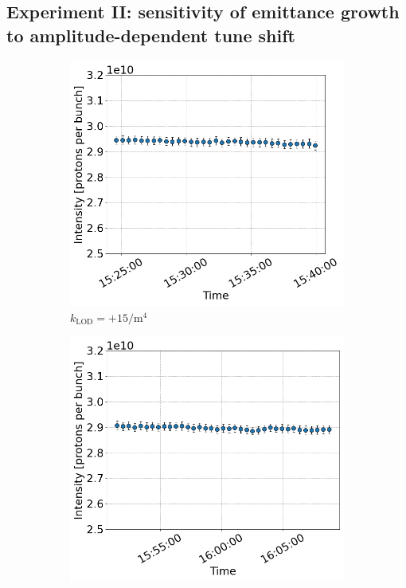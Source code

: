 \newpage
 \subsection{Experiment II: sensitivity of emittance growth to amplitude-dependent tune shift}\label{subsec:2022_exp2_intensity}


\begin{figure}[htp]
     \centering
     \begin{subfigure}{.45\textwidth}
         \centering
         \includegraphics[width=.95\linewidth]{images/app_e/intensity_cc_md_16May22_coast_6.png}  
         \caption{$k_\mathrm{LOD}=+15 \mathrm{/m^{4}}$}
     \end{subfigure}
     \begin{subfigure}{.45\textwidth}
         \centering
         \includegraphics[width=.95\linewidth]{images/app_e/intensity_cc_md_16May22_coast_7.png}  

\end{subfigure}
\end{figure}
